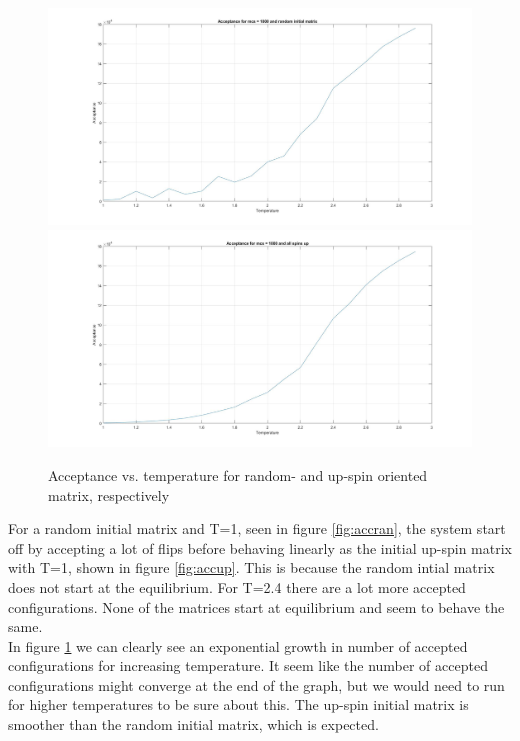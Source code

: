 \documentclass[10pt,a4paper]{article}
\begin{document}
\begin{figure}[H]
\centerline{
\includegraphics[scale=0.15]{acceptanceVStrandom}
\includegraphics[scale=0.15]{acceptanceVStupspin}
}
\caption{Acceptance vs. temperature for random- and up-spin oriented matrix, respectively}
\label{fig:acctemp}
\end{figure}

\noindent For a random initial matrix and T=1, seen in figure \ref{fig:accran}, the system start off by accepting a lot of flips before behaving linearly as the initial up-spin matrix with T=1, shown in figure \ref{fig:accup}. This is because the random intial matrix does not start at the equilibrium. For T=2.4 there are a lot more accepted configurations. None of the matrices start at equilibrium and seem to behave the same.\\
In figure \ref{fig:acctemp} we can clearly see an exponential growth in number of accepted configurations for increasing temperature. It seem like the number of accepted configurations might converge at the end of the graph, but we would need to run for higher temperatures to be sure about this. The up-spin initial matrix is smoother than the random initial matrix, which is expected.\\
\end{document}
